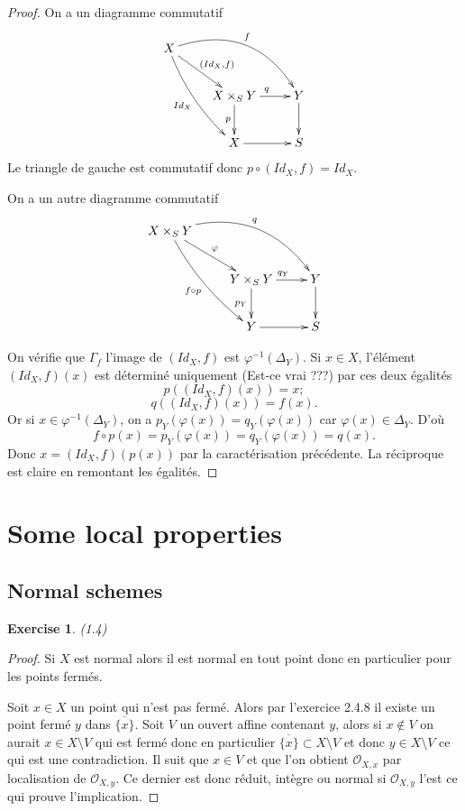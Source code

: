 \documentclass[A4, 11pt]{article}
\newtheorem{exer}{Exercise}
\begin{document}
 \begin{proof}
 On a un diagramme commutatif
$$\xymatrix{
X \ar@/_/[ddr]_{Id_X} \ar[rd]^{(Id_X,f)} \ar@/^2pc/[rrd]^{f}  & & \\
& X\times_S Y \ar[r]^{q} \ar[d]_{p} & Y\ar[d] \\
& X\ar[r] & S \\
}$$
Le triangle de gauche est commutatif donc $p\circ (Id_X,f)=Id_X$.


On a un autre diagramme commutatif
$$\xymatrix{
X\times_S Y \ar@/_/[ddr]_{f\circ p} \ar[rd]^{\varphi} \ar@/^2pc/[rrd]^{q}  & & \\
& Y\times_S Y \ar[r]^{q_Y} \ar[d]_{p_Y} & Y\ar[d] \\
& Y\ar[r] & S \\
}$$

On vérifie que $\Gamma_f$ l'image de $(Id_X,f)$ est $\varphi^{-1}(\Delta_Y)$. 
Si $x\in X$, l'élément $(Id_X,f)(x)$ est déterminé uniquement (Est-ce vrai ???) par ces deux égalités 
$$p( (Id_X,f)(x))= x;$$
$$q ( (Id_X,f)(x))=f(x).$$
Or si $x\in \varphi^{-1}(\Delta_Y)$, on a $p_Y(\varphi(x))=q_Y(\varphi(x))$ car $\varphi(x)\in \Delta_Y$. D'où
$$f\circ p (x)=p_Y (\varphi (x))=q_Y(\varphi(x))=q(x).$$
Donc $x=(Id_X,f)(p(x))$ par la caractérisation précédente. La réciproque est claire en remontant les égalités. 
 \end{proof}
 \section{Some local properties}
 \subsection{Normal schemes}
 \begin{exer}(1.4)
 \end{exer}
 \begin{proof}
 Si $X$ est normal alors il est normal en tout point donc en particulier pour les points fermés.
 
 Soit $x\in X$ un point qui n'est pas fermé. Alors par l'exercice 2.4.8 il existe un point fermé $y$ dans $\overline{\{x\}}$. Soit $V$ un ouvert affine contenant $y$, alors si $x\notin V$ on aurait $x\in X\setminus V$ qui est fermé donc en particulier $\overline{\{x\}}\subset X\setminus V$ et donc $y \in X\setminus V$ ce qui est une contradiction. Il suit que $x\in V$ et que l'on obtient $\mathcal{O}_{X,x}$ par localisation de $\mathcal{O}_{X,y}$. Ce dernier est donc réduit, intègre ou normal si $\mathcal{O}_{X,y}$ l'est ce qui prouve l'implication.
 \end{proof}
 
\end{document}
